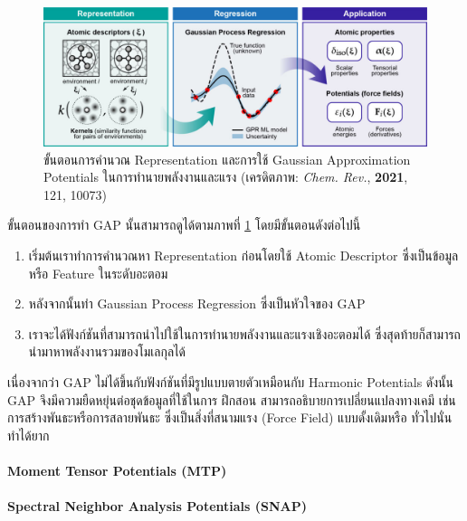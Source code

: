 \begin{figure}[htbp]
    \centering
    \includegraphics[width=\linewidth]{fig/gap_procedure.jpeg}
    \caption{ขั้นตอนการคำนวณ Representation และการใช้ Gaussian Approximation Potentials ในการทำนายพลังงานและแรง
    (เครดิตภาพ: \textit{Chem. Rev.}, \textbf{2021}, 121, 10073\autocite{deringer2019})}
    \label{fig:gap_procedure}
\end{figure}

ขั้นตอนของการทำ GAP นั้นสามารถดูได้ตามภาพที่ \ref{fig:gap_procedure} โดยมีขั้นตอนดังต่อไปนี้
\begin{enumerate}
    \item เริ่มต้นเราทำการคำนวณหา Representation ก่อนโดยใช้ Atomic Descriptor ซึ่งเป็นข้อมูลหรือ Feature ในระดับอะตอม
    \item หลังจากนั้นทำ Gaussian Process Regression ซึ่งเป็นหัวใจของ GAP
    \item เราจะได้ฟังก์ชันที่สามารถนำไปใช้ในการทำนายพลังงานและแรงเชิงอะตอมได้ ซึ่งสุดท้ายก็สามารถนำมาหาพลังงานรวมของโมเลกุลได้
\end{enumerate}

เนื่องจากว่า GAP ไม่ได้ขึ้นกับฟังก์ชันที่มีรูปแบบตายตัวเหมือนกับ Harmonic Potentials ดังนั้น GAP จึงมีความยืดหยุ่นต่อชุดข้อมูลที่ใช้ในการ%
ฝึกสอน สามารถอธิบายการเปลี่ยนแปลงทางเคมี เช่น การสร้างพันธะหรือการสลายพันธะ ซึ่งเป็นสิ่งที่สนามแรง (Force Field) แบบดั้งเดิมหรือ%
ทั่วไปนั่นทำได้ยาก\autocite{ceriotti2018}

\paragraph{Moment Tensor Potentials (MTP)}
\autocite{shapeev2016}
    
\paragraph{Spectral Neighbor Analysis Potentials (SNAP)} 
\autocite{thompson2015,deng2019,cusentino2020,domina2022}

